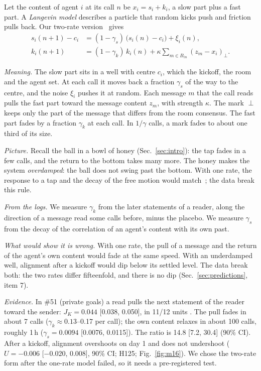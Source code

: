 Let the content of agent $i$ at its call $n$ be $x_i=s_i+k_i$, a slow part plus a fast part. A \emph{Langevin model} describes a particle that random kicks push and friction pulls back. Our two-rate version~\cite{uhlenbeck1930} gives
\begin{align}
s_i(n+1)-c_i&=(1-\gamma_s)\,\big(s_i(n)-c_i\big)+\xi_i(n),\nonumber\\
k_i(n+1)&=(1-\gamma_k)\,k_i(n)+\kappa\!\!\sum_{m\in B_{in}}\!\!(z_m-x_i)_\perp .
\label{eq:pic-langevin}
\end{align}

\emph{Meaning.} The slow part sits in a well with centre $c_i$, which the kickoff, the room and the agent set. At each call it moves back a fraction $\gamma_s$ of the way to the centre, and the noise $\xi_i$ pushes it at random. Each message $m$ that the call reads pulls the fast part toward the message content $z_m$, with strength $\kappa$. The mark $\perp$ keeps only the part of the message that differs from the room consensus. The fast part fades by a fraction $\gamma_k$ at each call. In $1/\gamma$ calls, a mark fades to about one third of its size.

\emph{Picture.} Recall the ball in a bowl of honey (Sec.~\ref{sec:intro}): the tap fades in a few calls, and the return to the bottom takes many more. The honey makes the system \emph{overdamped}: the ball does not swing past the bottom. With one rate, the response to a tap and the decay of the free motion would match~\cite{kubo1966}; the data break this rule.

\emph{From the logs.} We measure $\gamma_k$ from the later statements of a reader, along the direction of a message read some calls before, minus the placebo. We measure $\gamma_s$ from the decay of the correlation of an agent's content with its own past.

\emph{What would show it is wrong.} With one rate, the pull of a message and the return of the agent's own content would fade at the same speed. With an underdamped well, alignment after a kickoff would dip below its settled level. The data break both: the two rates differ fifteenfold, and there is no dip (Sec.~\ref{sec:predictions}, item 7).

\emph{Evidence.} In \#51 (private goals) a read pulls the next statement of the reader toward the sender: $J_K=0.044$ [0.038, 0.050], in 11/12 units . The pull fades in about 7 calls ($\gamma_k\approx0.13$--0.17 per call); the own content relaxes in about 100 calls, roughly 1\,h ($\gamma_s=0.0094$ [0.0076, 0.0115]). The ratio is 14.8 [7.2, 30.4] (90\% CI). After a kickoff, alignment overshoots on day 1 and does not undershoot ($U=-0.006$ [$-0.020$, 0.008], 90\% CI; H125; Fig.~\ref{fig:m16}). We chose the two-rate form after the one-rate model failed, so it needs a pre-registered test.

